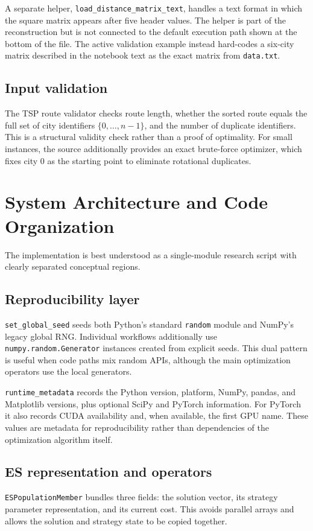 \documentclass[11pt,a4paper]{article}
\newcommand{\code}[1]{\texttt{#1}}
\begin{document}
A separate helper, \code{load\_distance\_matrix\_text}, handles a text format in which the square matrix appears after five header values. The helper is part of the reconstruction but is not connected to the default execution path shown at the bottom of the file. The active validation example instead hard-codes a six-city matrix described in the notebook text as the exact matrix from \code{data.txt}.

\subsection{Input validation}
The TSP route validator checks route length, whether the sorted route equals the full set of city identifiers $\{0,\ldots,n-1\}$, and the number of duplicate identifiers. This is a structural validity check rather than a proof of optimality. For small instances, the source additionally provides an exact brute-force optimizer, which fixes city 0 as the starting point to eliminate rotational duplicates.

\section{System Architecture and Code Organization}
The implementation is best understood as a single-module research script with clearly separated conceptual regions.

\subsection{Reproducibility layer}
\code{set\_global\_seed} seeds both Python's standard \code{random} module and NumPy's legacy global RNG. Individual workflows additionally use \code{numpy.random.Generator} instances created from explicit seeds. This dual pattern is useful when code paths mix random APIs, although the main optimization operators use the local generators.

\code{runtime\_metadata} records the Python version, platform, NumPy, pandas, and Matplotlib versions, plus optional SciPy and PyTorch information. For PyTorch it also records CUDA availability and, when available, the first GPU name. These values are metadata for reproducibility rather than dependencies of the optimization algorithm itself.

\subsection{ES representation and operators}
\code{ESPopulationMember} bundles three fields: the solution vector, its strategy parameter representation, and its current cost. This avoids parallel arrays and allows the solution and strategy state to be copied together.
\end{document}
